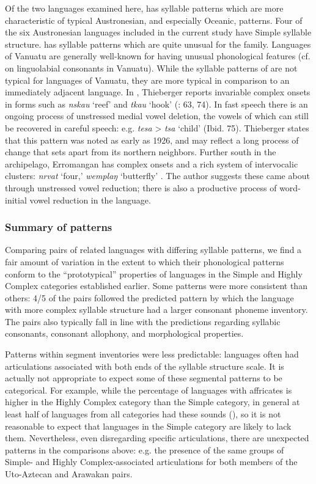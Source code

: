   Of the two languages examined here,  has syllable patterns which are more characteristic of typical Austronesian, and especially Oceanic, patterns. Four of the six Austronesian languages included in the current study have Simple syllable structure.  has syllable patterns which are quite unusual for the family. Languages of Vanuatu are generally well-known for having unusual phonological features (cf. \citealt{Maddieson1989b} on linguolabial consonants in Vanuatu). While the syllable patterns of  are not typical for languages of Vanuatu, they are more typical in comparison to an immediately adjacent language. In , Thieberger reports invariable complex onsets in forms such as \textit{nskau} ‘reef’ and \textit{tkau} ‘hook’ (\citealt{Thieberger2004}: 63, 74). In fast speech there is an ongoing process of unstressed medial vowel deletion, the vowels of which can still be recovered in careful speech: e.g. \textit{tesa} > \textit{tsa} ‘child’ (Ibid. 75). Thieberger states that this pattern was noted as early as 1926, and may reflect a long process of change that sets  apart from its northern neighbors. Further south in the archipelago, Erromangan has complex onsets and a rich system of intervocalic clusters: \textit{nrvat} ‘four,’ \textit{wemplaŋ} ‘butterfly’ \citep[20--22]{Crowley1998}. The author suggests these came about through unstressed vowel reduction; there is also a productive process of word-initial vowel reduction in the language.

\subsubsection{{Summary} {of} {patterns}}\label{sec:8.4.3.7}

  Comparing pairs of related languages with differing syllable patterns, we find a fair amount of variation in the extent to which their phonological patterns conform to the ``prototypical'' properties of languages in the Simple and Highly Complex categories established earlier. Some patterns were more consistent than others: 4/5 of the pairs followed the predicted pattern by which the language with more complex syllable structure had a larger consonant phoneme inventory. The pairs also typically fall in line with the predictions regarding syllabic consonants, consonant allophony, and morphological properties.

  Patterns within segment inventories were less predictable: languages often had articulations associated with both ends of the syllable structure scale. It is actually not appropriate to expect some of these segmental patterns to be categorical. For example, while the percentage of languages with affricates is higher in the Highly Complex category than the Simple category, in general at least half of languages from all categories had these sounds (), so it is not reasonable to expect that languages in the Simple category are likely to lack them. Nevertheless, even disregarding specific articulations, there are unexpected patterns in the comparisons above: e.g. the presence of the same groups of Simple- and Highly Complex-associated articulations for both members of the Uto-Aztecan and Arawakan pairs.


